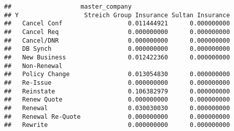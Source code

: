 \documentclass[]{article}
\begin{document}
\begin{verbatim}
##                   master_company
## Y                  Streich Group Insurance Sultan Insurance
##   Cancel Conf                  0.011444921      0.000000000
##   Cancel Req                   0.000000000      0.000000000
##   Cancel/DNR                   0.000000000      0.000000000
##   DB Synch                     0.000000000      0.000000000
##   New Business                 0.012422360      0.000000000
##   Non-Renewal                                              
##   Policy Change                0.013054830      0.000000000
##   Re-Issue                     0.000000000      0.000000000
##   Reinstate                    0.106382979      0.000000000
##   Renew Quote                  0.000000000      0.000000000
##   Renewal                      0.030030030      0.000000000
##   Renewal Re-Quote             0.000000000      0.000000000
##   Rewrite                      0.000000000      0.000000000
\end{verbatim}
\end{document}
